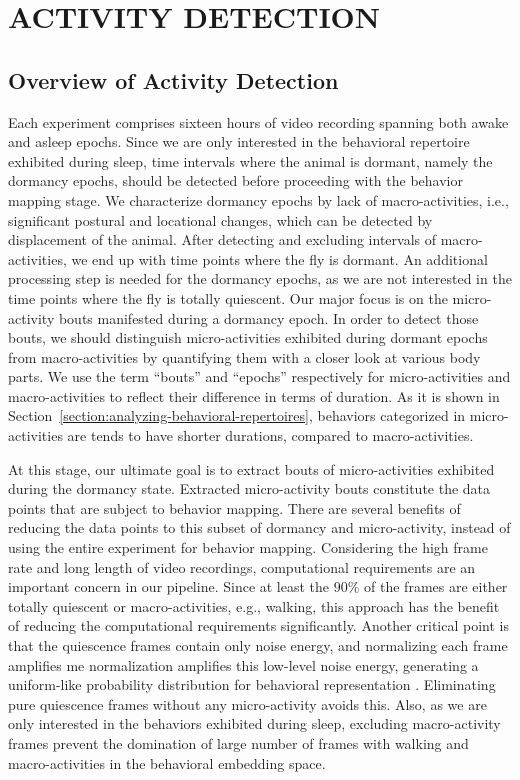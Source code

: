 \setlength{\parindent}{0pt}
\chapter{\bf ACTIVITY DETECTION}\label{chapter:activity-detection}
\section{Overview of Activity Detection}
Each experiment comprises sixteen hours of video recording spanning both awake and asleep epochs.
Since we are only interested in the behavioral repertoire exhibited during sleep, time intervals where the animal is dormant, namely the dormancy epochs, should be detected before proceeding with the behavior mapping stage.
We characterize dormancy epochs by lack of macro-activities, i.e., significant postural and locational changes, which can be detected by displacement of the animal.
After detecting and excluding intervals of macro-activities, we end up with time points where the fly is dormant.
An additional  processing step is needed for the dormancy epochs, as we are not interested in the time points where the fly is totally quiescent.
Our major focus is on the micro-activity bouts manifested during a dormancy epoch.
In order to detect those bouts, we should distinguish micro-activities exhibited during dormant epochs from macro-activities by quantifying them with a closer look at various body parts. We use the term ``bouts'' and ``epochs'' respectively for micro-activities and macro-activities to reflect their difference in terms of duration. As it is shown in Section~\ref{section:analyzing-behavioral-repertoires}, behaviors categorized in micro-activities are tends to have shorter durations, compared to macro-activities.

At this stage, our ultimate goal is to extract bouts of micro-activities exhibited during the dormancy state.
Extracted micro-activity bouts constitute the data points that are subject to behavior mapping.
There are several benefits of reducing the data points to this subset of dormancy and micro-activity, instead of using the entire experiment for behavior mapping.
Considering the high frame rate and long length of video recordings, computational requirements are an important concern in our pipeline.
Since  at least the $90\%$ of the frames are either totally quiescent or macro-activities, e.g., walking, this approach has the benefit of reducing the computational requirements significantly.
Another critical point is that the quiescence frames contain only noise energy, and normalizing each frame amplifies me normalization amplifies this low-level noise energy, generating a uniform-like probability distribution for behavioral representation \citep{todd_systematic_2017}.
Eliminating pure quiescence frames without any micro-activity avoids this.
Also, as we are only interested in the behaviors exhibited during sleep, excluding macro-activity frames prevent the domination of large number of frames with walking and macro-activities in the behavioral embedding space.

